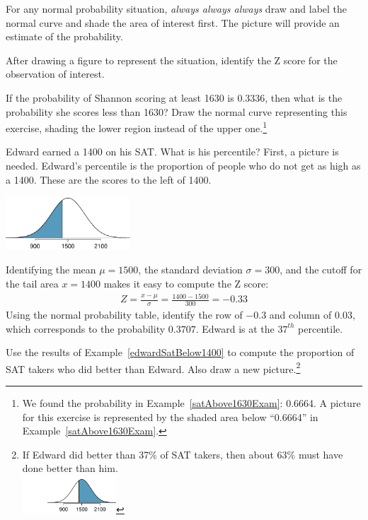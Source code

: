 \begin{tipBox}{
For any normal probability situation, \emph{always always always} draw and label the normal curve and shade the area of interest first. The picture will provide an estimate of the probability. \vspace{3mm}

After drawing a figure to represent the situation, identify the Z score for the observation of interest.\vspace{1mm}}
\end{tipBox}

\begin{exercise}
If the probability of Shannon scoring at least 1630 is 0.3336, then what is the probability she scores less than 1630? Draw the normal curve representing this exercise, shading the lower region instead of the upper one.\footnote{We found the probability in Example~\ref{satAbove1630Exam}: 0.6664. A picture for this exercise is represented by the shaded area below ``0.6664'' in Example~\ref{satAbove1630Exam}.}
\end{exercise}

\begin{example}{Edward earned a 1400 on his SAT. What is his percentile?} \label{edwardSatBelow1400}
First, a picture is needed. Edward's percentile is the proportion of people who do not get as high as a 1400. These are the scores to the left of 1400.
\begin{center}
\includegraphics[height=20mm]{02/figures/satBelow1400/satBelow1400}
\end{center}
Identifying the mean $\mu=1500$, the standard deviation $\sigma=300$, and the cutoff for the tail area $x=1400$ makes it easy to compute the Z score:
\begin{eqnarray*}
Z = \frac{x - \mu}{\sigma} = \frac{1400 - 1500}{300} = -0.33
\end{eqnarray*}
Using the normal probability table, identify the row of $-0.3$ and column of $0.03$, which corresponds to the probability $0.3707$. Edward is at the $37^{th}$ percentile.
\end{example}

\begin{exercise}
Use the results of Example~\ref{edwardSatBelow1400} to compute the proportion of SAT takers who did better than Edward. Also draw a new picture.\footnote{If Edward did better than 37\% of SAT takers, then about 63\% must have done better than him. \\
\includegraphics[height=14mm]{02/figures/satBelow1400/satAbove1400}}
\end{exercise}

